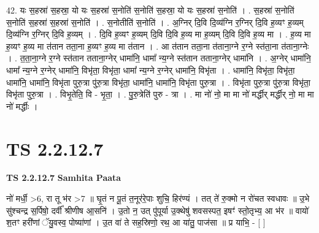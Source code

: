 \documentclass[17pt]{extarticle}
\begin{document}
42. यः स॒हस्रा॑ स॒हस्रा॒ यो यः स॒हस्रा॑ स॒नोति॑ स॒नोति॑ स॒हस्रा॒ यो यः स॒हस्रा॑ स॒नोति॑ । . स॒हस्रा॑ स॒नोति॑ स॒नोति॑ स॒हस्रा॑ स॒हस्रा॑ स॒नोति॑ । . स॒नोतीति॑ स॒नोति॑ । . अ॒ग्निर् दि॒वि दि॒व्य॑ग्नि र॒ग्निर् दि॒वि ह॒व्यꣳ ह॒व्यम् दि॒व्य॑ग्नि र॒ग्निर् दि॒वि ह॒व्यम् । . दि॒वि ह॒व्यꣳ ह॒व्यम् दि॒वि दि॒वि ह॒व्य मा ह॒व्यम् दि॒वि दि॒वि ह॒व्य मा । . ह॒व्य मा ह॒व्यꣳ ह॒व्य मा त॑तान तता॒ना ह॒व्यꣳ ह॒व्य मा त॑तान । . आ त॑तान तता॒ना त॑ताना॒ग्ने र॒ग्ने स्त॑ता॒ना त॑ताना॒ग्नेः । . त॒ता॒ना॒ग्ने र॒ग्ने स्त॑तान तताना॒ग्नेर् धामा॑नि॒ धामा᳚ न्य॒ग्ने स्त॑तान तताना॒ग्नेर् धामा॑नि । . अ॒ग्नेर् धामा॑नि॒ धामा᳚ न्य॒ग्ने र॒ग्नेर् धामा॑नि॒ विभृ॑ता॒ विभृ॑ता॒ धामा᳚ न्य॒ग्ने र॒ग्नेर् धामा॑नि॒ विभृ॑ता । . धामा॑नि॒ विभृ॑ता॒ विभृ॑ता॒ धामा॑नि॒ धामा॑नि॒ विभृ॑ता पुरु॒त्रा पु॑रु॒त्रा विभृ॑ता॒ धामा॑नि॒ धामा॑नि॒ विभृ॑ता पुरु॒त्रा । . विभृ॑ता पुरु॒त्रा पु॑रु॒त्रा विभृ॑ता॒ विभृ॑ता पुरु॒त्रा । . विभृ॒तेति॒ वि - भृ॒ता॒ । . पु॒रु॒त्रेति॑ पुरु - त्रा । . मा नो॑ नो॒ मा मा नो॑ मर्द्धीर् मर्द्धीर् नो॒ मा मा नो॑ मर्द्धीः । \newline
\pagebreak
{}
\section*{ TS 2.2.12.7 }

\textbf{TS 2.2.12.7 } \newline
\textbf{Samhita Paata} \newline

नो॑ मर्धी॒ >6, रा तू भ॑र >7 ॥ घृ॒तं न पू॒तं त॒नूर॑रे॒पाः शुचि॒ हिर॑ण्यं । तत् ते॑ रु॒क्मो न रो॑चत स्वधावः ॥  उ॒भे सु॑श्चन्द्र स॒र्पिषो॒ दर्वी᳚ श्रीणीष आ॒सनि॑ । उ॒तो न॒ उत् पु॑पूर्या उ॒क्थेषु॑ शवसस्पत॒ इषꣳ॑ स्तो॒तृभ्य॒ आ भ॑र ॥ वायो॑ श॒तꣳ हरी॑णां ॅयु॒वस्व॒ पोष्या॑णां । उ॒त वा॑ ते सह॒स्रिणो॒ रथ॒ आ या॑तु॒ पाज॑सा ॥ प्र याभि॒ - [  ] \newline
\end{document}
